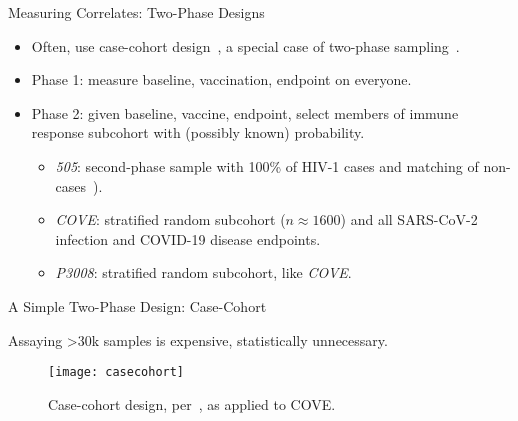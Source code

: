 \documentclass{beamer}
\begin{document}
\begin{frame}[c]{Measuring Correlates: Two-Phase Designs}

\begin{center}
\begin{itemize}
  \itemsep8pt
    \item Often, use case-cohort design~\citep{prentice1986case}, a special
      case of two-phase sampling~\citep{breslow2003large}.
    \item Phase 1: measure baseline, vaccination, endpoint on everyone.
    \item Phase 2: given baseline, vaccine, endpoint, select members of
      immune response subcohort with (possibly known) probability.
      \vspace{-1em}
      \begin{itemize}
        \itemsep4pt
        \item \textit{505}: second-phase sample with 100\% of HIV-1 cases and
          matching of non-cases~\citep[$n = 189$ per][]{janes2017higher}).
        \item \textit{COVE}: stratified random subcohort ($n \approx 1600$) and
          all SARS-CoV-2 infection and COVID-19 disease endpoints.
        \item \textit{P3008}: stratified random subcohort, like \textit{COVE}.
      \end{itemize}
\end{itemize}
\end{center}

\note{
}

\end{frame}


\begin{frame}[c]{A Simple Two-Phase Design: Case-Cohort}

Assaying >30k samples is expensive, statistically unnecessary.
\vspace{-1em}
\begin{figure}[H]
  \centering
  \texttt{[image: casecohort]}
  \captionsetup{labelformat=empty}
  \vspace{-1.5em}
  \caption{
    Case-cohort design, per~\citet{prentice1986case}, as applied to COVE.
  }
\end{figure}

\note{
}

\end{frame}
\end{document}
